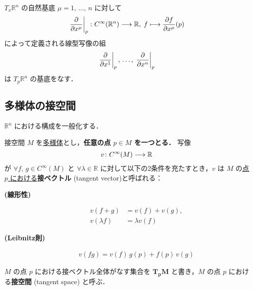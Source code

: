 \documentclass[geometry_main]{subfiles}
\begin{document}
\begin{mycol}[label=col:basis-tangentv-Rn]{$T_x\mathbb{R}^n$ の自然基底}
	$\mu = 1,\, \dots,\, n$ に対して
	\begin{align}
		\eval{\pdv{}{x^\mu}}_p \colon \cinftyf{\mathbb{R}^n} \lto \mathbb{R},\; f \lmto \pdv{f}{x^\mu}()(p)
	\end{align}
	によって定義される線型写像の組
	\begin{align}
		\eval{\pdv{}{x^1}}_p,\, \dots,\, \eval{\pdv{}{x^n}}_p
	\end{align}
	は $T_p \mathbb{R}^n$ の基底をなす．
\end{mycol}

\subsection{\cinfty 多様体の接空間}

$\mathbb{R}^n$ における構成を一般化する．
\begin{mydef}[label=def.tangentv]{接空間}
	$M$ を\hyperref[diffmani]{\cinfty 多様体}とし，\textbf{任意の点 $p \in M$ を一つとる．} 写像 
	\begin{align}
		v\colon C^\infty (M) \longrightarrow \mathbb{R}
	\end{align} 
	が $\forall f,\, g \in C^\infty (M)$ と $\forall \lambda \in \mathbb{R}$ に対して以下の2条件を充たすとき，$v$ は $M$ の\underline{点 $p$ における}\textbf{接ベクトル} (tangent vector)と呼ばれる：
	\begin{description}
		\item[\textbf{(線形性)}] 
		\begin{align}
			v(f + g) &= v(f) + v(g),\\
			v(\lambda f) &= \lambda v(f)
		\end{align}
		\item[\textbf{(Leibnitz則)}] \begin{align}
			v(fg) = v(f)\, g(p) + f(p)\, v(g)
		\end{align}
	\end{description}
	$M$ の点 $p$ における接ベクトル全体がなす集合を $\bm{T_pM}$ と書き，$M$ の点 $p$ における\textbf{接空間} (tangent space) と呼ぶ．
\end{mydef}
\end{document}
